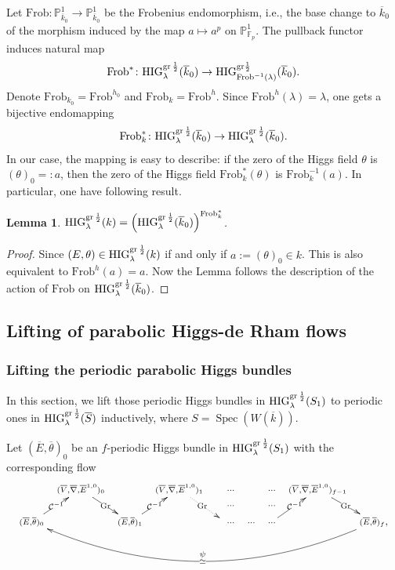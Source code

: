 \documentclass[12pt,twoside]{book}
\theoremstyle{plain}
\newtheorem{lemma}[lemma]{Lemma}
\theoremstyle{definition}
\theoremstyle{remark}
\newcommand{\bF}{{\mathbb F}}
\newcommand{\bP}{{\mathbb P}}
\newcommand{\mC}{{\mathcal C}}
\DeclareMathOperator\Spec{Spec}
\newcommand{\HIG}{\mathrm{HIG}}
\numberwithin{equation}{section}
\def\High{{\mathrm{HIG}^{{\rm gr}\,{1\over 2}}_{\lambda}}}
\def\Frob{\mathrm{Frob}}
\def\bark{{\overline k}_0}
\begin{document}
Let $\Frob\colon \bP_{\bark}^1 \rightarrow \bP_{\bark}^1$ be the Frobenius endomorphism, i.e., the base change to $\bark$ of the morphism induced by the map $a \mapsto a^p$ on $\bP^1_{\bF_p}$. The pullback functor induces natural map
\[\Frob^*\colon\High(\bark) \rightarrow \HIG_{\Frob^{-1}(\lambda)}^{\mathrm{gr}{1\over2}}(\bark).\]
Denote $\Frob_{k_0}=\Frob^{h_0}$ and $\Frob_k=\Frob^{h}$. Since $\Frob^{h}(\lambda)=\lambda$, one gets a bijective endomapping
\[\Frob_k^*\colon\High(\bark) \rightarrow \High(\bark).\]
In our case, the mapping is easy to describe: if the zero of the Higgs field $\theta$ is $(\theta)_0=:a$, then the zero of the Higgs field $\Frob_k^*(\theta)$ is $\Frob_k^{-1}(a)$. In particular, one have following result.
\begin{lemma}
$\High(k) = \Big(\High(\bark)\Big)^{\Frob_k^*}$.
\end{lemma}
\begin{proof}
Since $(E,\theta)\in\High(k)$ if and only if $a:=(\theta)_0\in k$. This is also equivalent to $\Frob^{h}(a)=a$. Now the Lemma follows the description of the action of $\Frob$ on $\High(\bark)$.
\end{proof}



\newpage
\subsection{Lifting of parabolic Higgs-de Rham flows}
\subsubsection{Lifting the periodic parabolic Higgs bundles}

In this section, we lift those periodic Higgs bundles in $\High(S_1)$ to periodic ones in $\High(\overline{S})$ inductively, where $S=\Spec(W(\overline{k}))$.

Let $(\overline{E},\overline{\theta})_0$ be an $f$-periodic Higgs bundle in $\High(S_1)$ with the corresponding flow
\begin{equation*}
\xymatrix@C=2mm@R=5mm{
& {\scriptstyle (\overline V,\overline\nabla,\overline {E}^{1,0})_0} \ar[rd]|{\text{Gr}}
&
& {\scriptstyle (\overline V,\overline\nabla,\overline E^{1,0})_1} \ar@{.>}[rd]|{\text{Gr}}
& {\scriptstyle \quad \cdots} \ar@{}[d]|{\quad\cdots}
&
& {\scriptstyle \cdots} \ar@{}[d]|{\cdots}
& {\scriptstyle (\overline V,\overline\nabla,\overline E^{1,0})_{f-1}} \ar[rd]|{\text{Gr}}
&
\\
{\scriptstyle (\overline E,\overline\theta)_0} \ar[ru]|{\mC^{-1}}
&
& {\scriptstyle (\overline E,\overline\theta)_1} \ar[ru]|{\mC^{-1}}
&
& {\scriptstyle \quad \cdots}
& {\scriptstyle \cdots}
& {\scriptstyle \cdots} \ar[ru]|{\mC^{-1}}
&
& {\scriptstyle (\overline E,\overline\theta)_{f}},\ar@/^3pc/[llllllll]|{\simeq}_{\psi}
}
\end{equation*}
\end{document}
